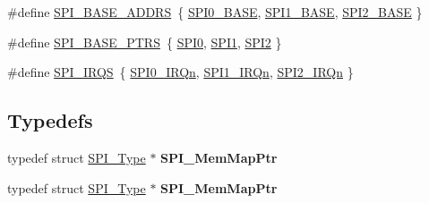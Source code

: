 \begin{DoxyCompactItemize}
\item 
\#define \hyperlink{group__SPI__Peripheral__Access__Layer_gab542f6d657e05e21cc2c9e66ae3ceb41}{S\+P\+I\+\_\+\+B\+A\+S\+E\+\_\+\+A\+D\+D\+RS}~\{ \hyperlink{group__SPI__Peripheral__Access__Layer_gadeaa49ab944c7dcae2a868b0450232c8}{S\+P\+I0\+\_\+\+B\+A\+SE}, \hyperlink{group__SPI__Peripheral__Access__Layer_ga50cd8b47929f18b05efbd0f41253bf8d}{S\+P\+I1\+\_\+\+B\+A\+SE}, \hyperlink{group__SPI__Peripheral__Access__Layer_gac3e357b4c25106ed375fb1affab6bb86}{S\+P\+I2\+\_\+\+B\+A\+SE} \}
\item 
\#define \hyperlink{group__SPI__Peripheral__Access__Layer_ga3a16fecfe27c2052ab60e014be3f66f6}{S\+P\+I\+\_\+\+B\+A\+S\+E\+\_\+\+P\+T\+RS}~\{ \hyperlink{group__SPI__Peripheral__Access__Layer_gaf26e39c91b262cc480085abcc450d3d5}{S\+P\+I0}, \hyperlink{group__SPI__Peripheral__Access__Layer_gad483be344a28ac800be8f03654a9612f}{S\+P\+I1}, \hyperlink{group__SPI__Peripheral__Access__Layer_gaf2c3d8ce359dcfbb2261e07ed42af72b}{S\+P\+I2} \}
\item 
\#define \hyperlink{group__SPI__Peripheral__Access__Layer_ga30fd955e8b934f6ea091b7476a020d59}{S\+P\+I\+\_\+\+I\+R\+QS}~\{ \hyperlink{group__Interrupt__vector__numbers_gga666eb0caeb12ec0e281415592ae89083afa7f89ab9f5d1965ea1599578d01a454}{S\+P\+I0\+\_\+\+I\+R\+Qn}, \hyperlink{group__Interrupt__vector__numbers_gga666eb0caeb12ec0e281415592ae89083aacdff1a9c42582ed663214cbe62c1174}{S\+P\+I1\+\_\+\+I\+R\+Qn}, \hyperlink{group__Interrupt__vector__numbers_gga666eb0caeb12ec0e281415592ae89083a505fbd4ccf7c2a14c8b76dc9e58f7ede}{S\+P\+I2\+\_\+\+I\+R\+Qn} \}
\end{DoxyCompactItemize}
\subsection*{Typedefs}
\begin{DoxyCompactItemize}
\item 
typedef struct \hyperlink{structSPI__Type}{S\+P\+I\+\_\+\+Type} $\ast$ {\bfseries S\+P\+I\+\_\+\+Mem\+Map\+Ptr}\hypertarget{group__SPI__Peripheral__Access__Layer_ga100ce9a2b42972ea38f07d8d158361d6}{}\label{group__SPI__Peripheral__Access__Layer_ga100ce9a2b42972ea38f07d8d158361d6}

\item 
typedef struct \hyperlink{structSPI__Type}{S\+P\+I\+\_\+\+Type} $\ast$ {\bfseries S\+P\+I\+\_\+\+Mem\+Map\+Ptr}\hypertarget{group__SPI__Peripheral__Access__Layer_ga100ce9a2b42972ea38f07d8d158361d6}{}\label{group__SPI__Peripheral__Access__Layer_ga100ce9a2b42972ea38f07d8d158361d6}

\end{DoxyCompactItemize}


